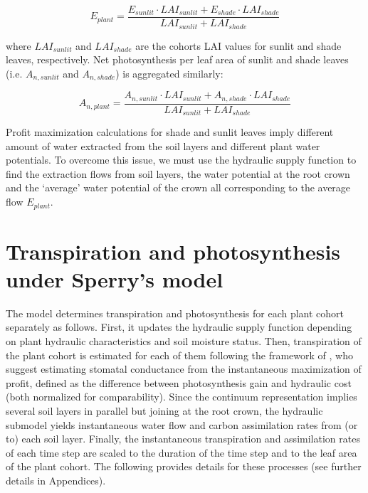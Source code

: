 \documentclass[]{book}
\begin{document}
\begin{equation}
 E_{plant} = \frac{E_{sunlit} \cdot LAI_{sunlit} + E_{shade} \cdot LAI_{shade}}{LAI_{sunlit} + LAI_{shade}}
\end{equation}

where \(LAI_{sunlit}\) and \(LAI_{shade}\) are the cohorts LAI values
for sunlit and shade leaves, respectively. Net photosynthesis per leaf
area of sunlit and shade leaves (i.e. \(A_{n,sunlit}\) and
\(A_{n,shade}\)) is aggregated similarly:

\begin{equation}
 A_{n, plant} = \frac{A_{n,sunlit} \cdot LAI_{sunlit} + A_{n,shade} \cdot LAI_{shade}}{LAI_{sunlit} + LAI_{shade}}
\end{equation}

Profit maximization calculations for shade and sunlit leaves imply
different amount of water extracted from the soil layers and different
plant water potentials. To overcome this issue, we must use the
hydraulic supply function to find the extraction flows from soil layers,
the water potential at the root crown and the `average' water potential
of the crown all corresponding to the average flow \(E_{plant}\).

\chapter{Transpiration and photosynthesis under Sperry's
model}\label{transpirationsperry}

The model determines transpiration and photosynthesis for each plant
cohort separately as follows. First, it updates the hydraulic supply
function depending on plant hydraulic characteristics and soil moisture
status. Then, transpiration of the plant cohort is estimated for each of
them following the framework of \citet{Sperry2016}, who suggest
estimating stomatal conductance from the instantaneous maximization of
profit, defined as the difference between photosynthesis gain and
hydraulic cost (both normalized for comparability). Since the continuum
representation implies several soil layers in parallel but joining at
the root crown, the hydraulic submodel yields instantaneous water flow
and carbon assimilation rates from (or to) each soil layer. Finally, the
instantaneous transpiration and assimilation rates of each time step are
scaled to the duration of the time step and to the leaf area of the
plant cohort. The following provides details for these processes (see
further details in Appendices).
\end{document}
